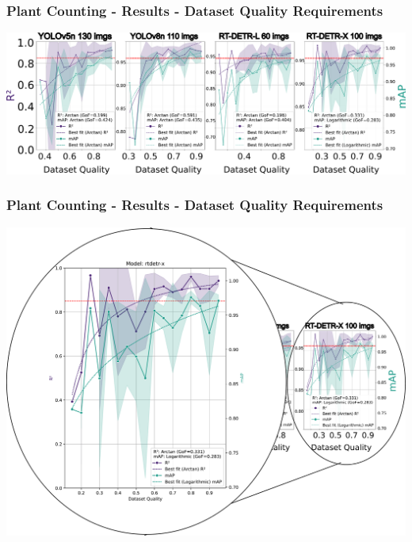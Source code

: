 \documentclass[aspectratio=43]{beamer}
\begin{document}
\begin{frame}
    \frametitle{Plant Counting - Results - Dataset Quality Requirements}
        
    \begin{center}
        \includegraphics[width=1\textwidth]{Imgs/r2_ap_vs_dataset_quality_2.pdf}
    \end{center}
\end{frame}
\begin{frame}
    \frametitle{Plant Counting - Results - Dataset Quality Requirements}
        
    \begin{center}
        \includegraphics[width=1\textwidth]{Imgs/r2_ap_vs_dataset_quality_3.pdf}
    \end{center}
\end{frame}
\end{document}
